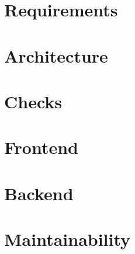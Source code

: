 
\chapter{Requirements}


\chapter{Architecture}


\chapter{Checks}


\chapter{Frontend}


\chapter{Backend}


\chapter{Maintainability}



